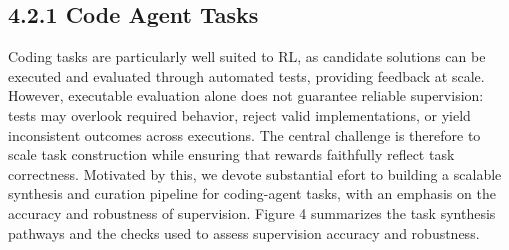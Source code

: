 \documentclass[
  10
]{article}
\begin{document}
\subsection{4.2.1 Code Agent Tasks}\label{code-agent-tasks}

Coding tasks are particularly well suited to RL, as candidate solutions
can be executed and evaluated through automated tests, providing
feedback at scale. However, executable evaluation alone does not
guarantee reliable supervision: tests may overlook required behavior,
reject valid implementations, or yield inconsistent outcomes across
executions. The central challenge is therefore to scale task
construction while ensuring that rewards faithfully reflect task
correctness. Motivated by this, we devote substantial efort to building
a scalable synthesis and curation pipeline for coding-agent tasks, with
an emphasis on the accuracy and robustness of supervision. Figure 4
summarizes the task synthesis pathways and the checks used to assess
supervision accuracy and robustness.
\end{document}
